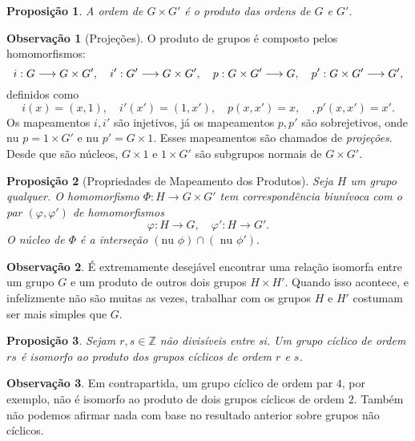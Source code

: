 \documentclass[a4paper,12pt]{report}
\theoremstyle{plain}
\newtheorem{proposicao}{Proposição}[section]
\theoremstyle{definition}
\newtheorem{observacao}{Observação}[section]
\begin{document}
\begin{proposicao}
	A ordem de \(G\times G'\) é o produto das ordens de
	\(G\) e \(G'\).	
\end{proposicao}

\begin{observacao}[Projeções]
	O produto de grupos é composto pelos homomorfismos:
	\[i: G\longrightarrow G\times G', \quad i': G'\longrightarrow G\times G', \newline \quad p: G\times G'\longrightarrow G, \quad p': G\times G'\longrightarrow G',\]
	definidos como
	\[i(x) = (x,1), \quad i'(x') = (1,x'), \quad p(x,x') = x, \quad, p'(x,x') = x'.\]
	Os mapeamentos \(i,i'\) são injetivos, já os mapeamentos \(p,p'\) são
	sobrejetivos, onde \(\text{nu }p = 1\times G'\) e
	\(\text{nu }p' = G\times 1\). Esses mapeamentos são chamados de
	\emph{projeções}. Desde que são núcleos, \(G\times 1\) e \(1\times G'\)
	são subgrupos normais de \(G\times G'\).
\end{observacao}

\begin{proposicao}[Propriedades de Mapeamento dos Produtos]
	Seja
	\(H\) um grupo qualquer. O homomorfismo
	\(\Phi: H\longrightarrow G\times G'\) tem correspondência biunívoca com
	o par \((\varphi, \varphi')\) de homomorfismos
	\[\varphi:H\longrightarrow G, \quad \varphi': H\longrightarrow G'.\]
	O núcleo de \(\Phi\) é a interseção
	\((\text{nu }\phi)\cap(\text{ nu }\phi').\)	
\end{proposicao}

\begin{observacao}
	É extremamente desejável encontrar uma relação isomorfa entre um grupo
	\(G\) e um produto de outros dois grupos \(H\times H'\). Quando isso
	acontece, e infelizmente não são muitas as vezes, trabalhar com os
	grupos \(H\) e \(H'\) costumam ser mais simples que \(G\).
\end{observacao}

\begin{proposicao}
	Sejam \(r,s\in\mathbb{Z}\) não divisíveis entre si.
	Um grupo cíclico de ordem \(rs\) é isomorfo ao produto dos grupos
	cíclicos de ordem \(r\) e \(s\).	
\end{proposicao}

\begin{observacao}
	Em contrapartida, um grupo cíclico de ordem par \(4\), por exemplo, não
	é isomorfo ao produto de dois grupos cíclicos de ordem \(2\). Também não
	podemos afirmar nada com base no resultado anterior sobre grupos não
	cíclicos.
\end{observacao}
\end{document}
